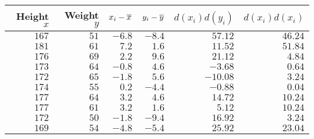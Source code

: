 \begin{tabular}{rrrrrr}                                                                    \toprule
Height $x$ & Weight $y$ & $x_i - \overline{x}$ & $y_i - \overline{y}$ & $d(x_i)d(y_i)$ & $d(x_i)d(x_i)$ \\\midrule
$167$      & $51$       & $-6.8$        & $-8.4$        & $57.12$       & $46.24$        \\
$181$      & $61$       & $7.2$         & $1.6$         & $11.52$       & $51.84$        \\
$176$      & $69$       & $2.2$         & $9.6$         & $21.12$       & $4.84$         \\
$173$      & $64$       & $-0.8$        & $4.6$         & $-3.68$       & $0.64$         \\
$172$      & $65$       & $-1.8$        & $5.6$         & $-10.08$      & $3.24$         \\
$174$      & $55$       & $0.2$         & $-4.4$        & $-0.88$       & $0.04$         \\
$177$      & $64$       & $3.2$         & $4.6$         & $14.72$       & $10.24$        \\
$177$      & $61$       & $3.2$         & $1.6$         & $5.12$        & $10.24$        \\
$172$      & $50$       & $-1.8$        & $-9.4$        & $16.92$       & $3.24$         \\
$169$      & $54$       & $-4.8$        & $-5.4$        & $25.92$       & $23.04$        \\\bottomrule
\end{tabular}
